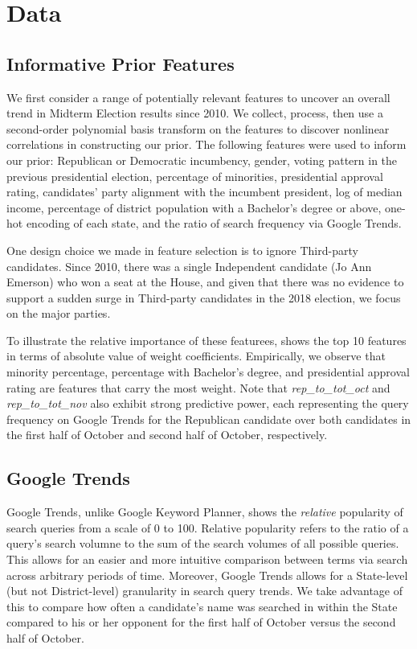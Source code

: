 \documentclass[11pt]{article}
\begin{document}
\section{Data}
\label{sec:data}
\subsection{Informative Prior Features}
We first consider a range of potentially relevant features to uncover an overall trend in Midterm Election results since 2010. We collect, process, then use a second-order polynomial basis transform on the features to discover nonlinear correlations in constructing our prior. The following features were used to inform our prior: Republican or Democratic incumbency, gender, voting pattern in the previous presidential election, percentage of minorities, presidential approval rating, candidates’ party alignment with the incumbent president, log of median income, percentage of district population with a Bachelor’s degree or above, one-hot encoding of each state, and the ratio of search frequency via Google Trends.

One design choice we made in feature selection is to ignore Third-party candidates. Since 2010, there was a single Independent candidate (Jo Ann Emerson) who won a seat at the House, and given that there was no evidence to support a sudden surge in Third-party candidates in the 2018 election, we focus on the major parties.

To illustrate the relative importance of these featurees,  shows the top 10
features in terms of absolute value of weight coefficients. Empirically, we observe that minority percentage, percentage with Bachelor's degree, and presidential approval rating are features that carry the most weight. Note that \textit{rep\_to\_tot\_oct} and \textit{rep\_to\_tot\_nov} also exhibit strong predictive power, each representing the query frequency on Google Trends for the Republican candidate over both candidates in the first half of October and second half of October, respectively.

\subsection{Google Trends}
Google Trends, unlike Google Keyword Planner, shows the \textit{relative} popularity of search queries from a scale of 0 to 100. Relative popularity refers to the ratio of a query's search volumne to the sum of the search volumes of all possible queries. This allows for an easier and more intuitive comparison between terms via search across arbitrary periods of time. Moreover, Google Trends allows for a State-level (but not District-level) granularity in search query trends. We take advantage of this to compare how often a candidate's name was searched in within the State compared to his or her opponent for the first half of October versus the second half of October.
\end{document}
